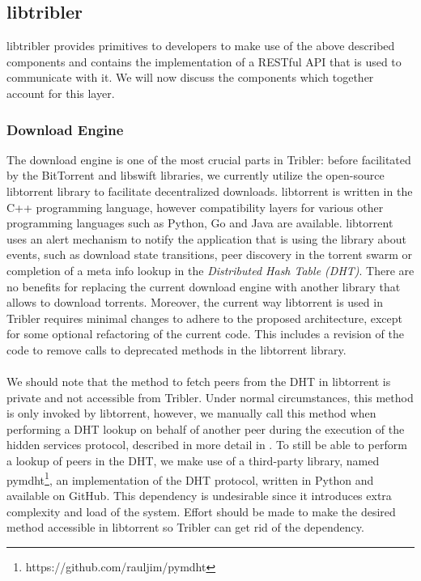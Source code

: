 \subsection{libtribler}
libtribler provides primitives to developers to make use of the above described components and contains the implementation of a RESTful API that is used to communicate with it. We will now discuss the components which together account for this layer.

\subsubsection{\textbf{Download Engine}}
The download engine is one of the most crucial parts in Tribler: before facilitated by the BitTorrent and libswift libraries, we currently utilize the open-source libtorrent library to facilitate decentralized downloads. libtorrent is written in the C++ programming language, however compatibility layers for various other programming languages such as Python, Go and Java are available. libtorrent uses an alert mechanism to notify the application that is using the library about events, such as download state transitions, peer discovery in the torrent swarm or completion of a meta info lookup in the \emph{Distributed Hash Table (DHT)}. There are no benefits for replacing the current download engine with another library that allows to download torrents. Moreover, the current way libtorrent is used in Tribler requires minimal changes to adhere to the proposed architecture, except for some optional refactoring of the current code. This includes a revision of the code to remove calls to deprecated methods in the libtorrent library.\\\\
We should note that the method to fetch peers from the DHT in libtorrent is private and not accessible from Tribler. Under normal circumstances, this method is only invoked by libtorrent, however, we manually call this method when performing a DHT lookup on behalf of another peer during the execution of the hidden services protocol, described in more detail in \cite{ruigrok2015bittorrent}. To still be able to perform a lookup of peers in the DHT, we make use of a third-party library, named pymdht\footnote{https://github.com/rauljim/pymdht}, an implementation of the DHT protocol, written in Python and available on GitHub. This dependency is undesirable since it introduces extra complexity and load of the system. Effort should be made to make the desired method accessible in libtorrent so Tribler can get rid of the dependency.

